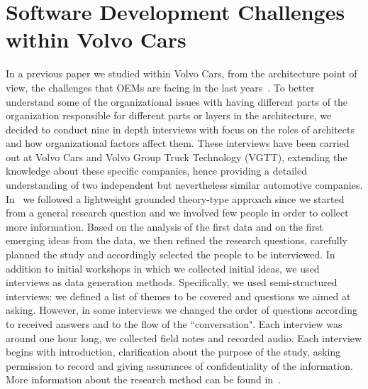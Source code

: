 \section{Software Development Challenges within Volvo Cars}\label{sec:lessonsLearned}

In a previous paper we studied within Volvo Cars,
from the architecture point of view,
the challenges that OEMs are facing in the last years~\cite{WICSA2015}. 
To better understand some of the
organizational issues with having different parts of the organization responsible for different parts or layers in the architecture, we decided to conduct nine in depth interviews with
focus on the roles of architects and how organizational factors affect them.
These interviews have been carried out at Volvo Cars  and Volvo Group Truck Technology
(VGTT), extending the knowledge about these specific companies, hence providing a detailed understanding of two independent but nevertheless similar automotive companies. %
In~\cite{WICSA2015} we 
followed a lightweight grounded theory-type approach since we started from a general research question and we involved few people in order to collect more information. Based on the analysis of the first data and on the first emerging ideas from the data, we then refined the research questions, carefully planned the study and accordingly selected the people to be interviewed. 
In addition to initial workshops in which we collected initial ideas, we used interviews as data generation methods. Specifically, we used semi-structured interviews: we defined a list of themes to be covered and questions we aimed at asking. However, in some interviews we changed the order of questions according to received answers and to the flow of the ``conversation". 
Each interview was around one hour long, we collected field notes and recorded audio. Each interview begins with introduction, clarification about the purpose of the study, asking permission to record and giving assurances of confidentiality of the information. 
{More information about the research method can be found in~\cite{WICSA2015}}. 


